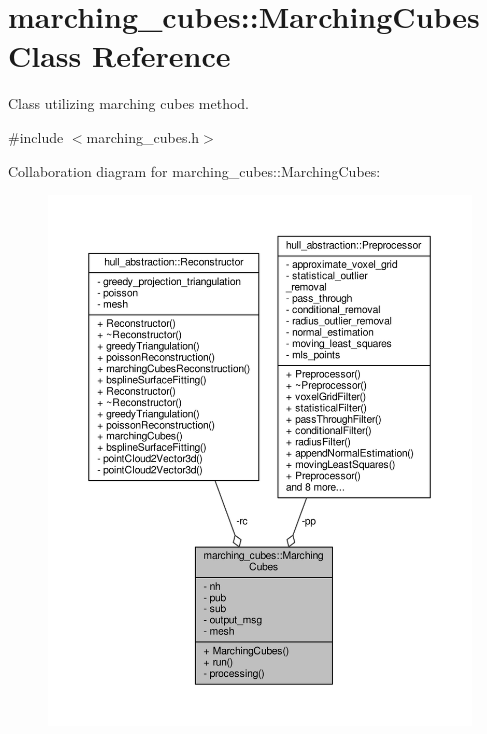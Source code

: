 \hypertarget{classmarching__cubes_1_1_marching_cubes}{}\section{marching\+\_\+cubes\+:\+:Marching\+Cubes Class Reference}
\label{classmarching__cubes_1_1_marching_cubes}


Class utilizing marching cubes method.  




{\ttfamily \#include $<$marching\+\_\+cubes.\+h$>$}



Collaboration diagram for marching\+\_\+cubes\+:\+:Marching\+Cubes\+:\nopagebreak
\begin{figure}[H]
\begin{center}
\leavevmode
\includegraphics[width=350pt]{classmarching__cubes_1_1_marching_cubes__coll__graph}
\end{center}
\end{figure}
